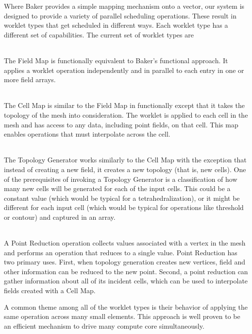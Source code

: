 \documentclass[conference]{IEEEtran}
\begin{document}
Where Baker provides a simple mapping mechanism onto a vector, our system
is designed to provide a variety of parallel scheduling operations.  These
result in worklet types that get scheduled in different ways.  Each worklet
type has a different set of capabilities.  The current set of worklet types
are

\begin{description}[\IEEEsetlabelwidth{\quad}]
\item[Field Map]~\\ The Field Map is functionally equivalent to Baker's
  functional approach.  It applies a worklet operation independently and in
  parallel to each entry in one or more field arrays.
\item[Cell Map]~\\ The Cell Map is similar to the Field Map in functionally
  except that it takes the topology of the mesh into consideration.  The
  worklet is applied to each cell in the mesh and has access to any data,
  including point fields, on that cell.  This map enables operations that
  must interpolate across the cell.
\item[Topology Generator]~\\ The Topology Generator works similarly to the
  Cell Map with the exception that instead of creating a new field, it
  creates a new topology (that is, new cells).  One of the prerequisites of
  invoking a Topology Generator is a classification of how many new cells
  will be generated for each of the input cells.  This could be a constant
  value (which would be typical for a tetrahedralization), or it might be
  different for each input cell (which would be typical for operations like
  threshold or contour) and captured in an array.
\item[Point Reduction]~\\ A Point Reduction operation collects values
  associated with a vertex in the mesh and performs an operation that
  reduces to a single value.  Point Reduction has two primary uses.  First,
  when topology generation creates new vertices, field and other
  information can be reduced to the new point.  Second, a point reduction
  can gather information about all of its incident cells, which can be used
  to interpolate fields created with a Cell Map.
\end{description}

A common theme among all of the worklet types is their behavior of applying
the same operation across many small elements.  This approach is well
proven to be an efficient mechanism to drive many compute core
simultaneously.
\end{document}
